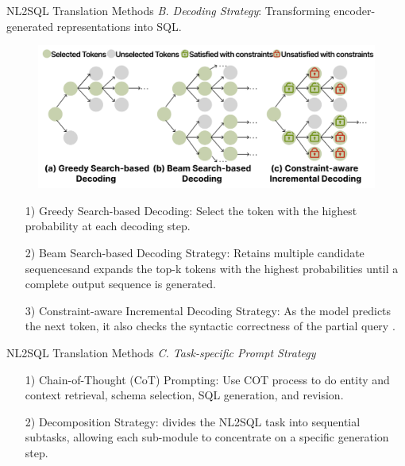 \documentclass[aspectratio=169,xcolor=dvipsnames]{beamer}
\begin{document}
\begin{frame}{NL2SQL Translation Methods}
    \textit{B. Decoding Strategy}: Transforming encoder-generated representations into SQL.
    \begin{figure}
        \includegraphics[width=.55\linewidth]{assets/decoding.png}
    \end{figure}
    \begin{itemize}
        \item[1)]Greedy Search-based Decoding: Select the token with the highest probability at each decoding step.
        \item[2)]Beam Search-based Decoding Strategy: Retains multiple candidate sequencesand expands the top-k tokens with the highest probabilities until a complete output sequence is generated.
        \item[3)]Constraint-aware Incremental Decoding Strategy: As the model predicts the next token, it also checks the syntactic correctness of the partial query .
    \end{itemize}
\end{frame}

\begin{frame}{NL2SQL Translation Methods}
    \textit{C. Task-specific Prompt Strategy}

    \begin{itemize}
        \item[1)]Chain-of-Thought (CoT) Prompting: Use COT process to do entity and context retrieval, schema selection, SQL generation, and revision.
        \item[2)]Decomposition Strategy: divides the NL2SQL task into sequential subtasks, allowing each sub-module to concentrate on a specific generation step.
    \end{itemize}
\end{frame}
\end{document}
